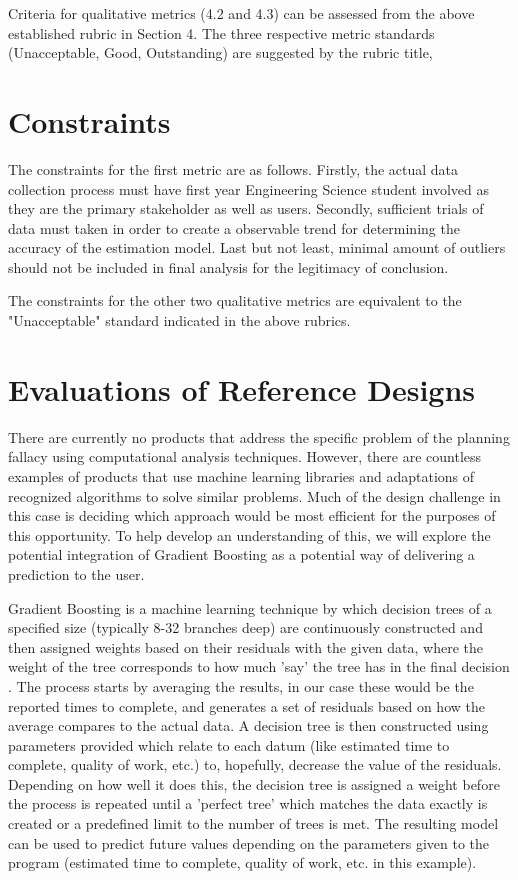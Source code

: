 \documentclass[11pt]{article}
\begin{document}
    Criteria for qualitative metrics (4.2 and 4.3) can be assessed from the above established rubric in Section 4. The three respective metric standards (Unacceptable, Good, Outstanding) are suggested by the rubric title,

\section{Constraints}
    The constraints for the first metric are as follows. Firstly, the actual data collection process must have first year Engineering Science student involved as they are the primary stakeholder as well as users. Secondly, sufficient trials of data must taken in order to create a observable trend for determining the accuracy of the estimation model. Last but not least, minimal amount of outliers should not be included in final analysis for the legitimacy of conclusion. 
    
    The constraints for the other two qualitative metrics are equivalent to the "Unacceptable" standard indicated in the above rubrics. 

\section{Evaluations of Reference Designs}
    There are currently no products that address the specific problem of the planning fallacy using computational analysis techniques. However, there are countless examples of products that use machine learning libraries and adaptations of recognized algorithms to solve similar problems. Much of the design challenge in this case is deciding which approach would be most efficient for the purposes of this opportunity. To help develop an understanding of this, we will explore the potential integration of Gradient Boosting as a potential way of delivering a prediction to the user.
    
    Gradient Boosting is a machine learning technique by which decision trees of a specified size (typically 8-32 branches deep) are continuously constructed and then assigned weights based on their residuals with the given data, where the weight of the tree corresponds to how much 'say' the tree has in the final decision \cite{friedman2002stochastic}. The process starts by averaging the results, in our case these would be the reported times to complete, and generates a set of residuals based on how the average compares to the actual data. A decision tree is then constructed using parameters provided which relate to each datum (like estimated time to complete, quality of work, etc.) to, hopefully, decrease the value of the residuals. Depending on how well it does this, the decision tree is assigned a weight before the process is repeated until a 'perfect tree' which matches the data exactly is created or a predefined limit to the number of trees is met. The resulting model can be used to predict future values depending on the parameters given to the program (estimated time to complete, quality of work, etc. in this example).
    
\end{document}
